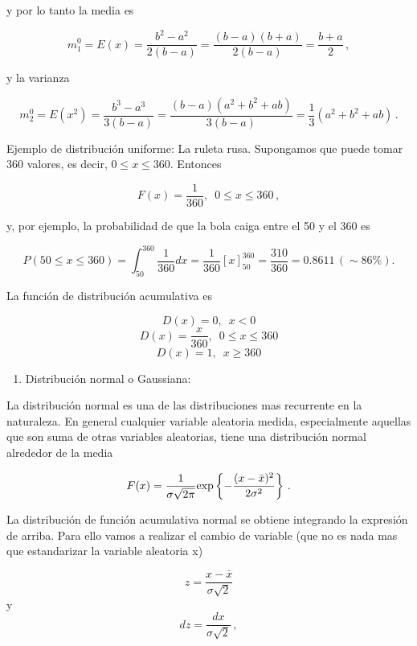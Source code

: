 \documentclass[
]{agujournal2019}
\providecommand{\tightlist}{%
  \setlength{\itemsep}{0pt}\setlength{\parskip}{0pt}}\usepackage{longtable,booktabs,array}
\begin{document}
y por lo tanto la media es

\[m^0_1=E(x)=\frac{b^2-a^2}{2(b-a)}=\frac{(b-a)(b+a)}{2(b-a)}=\frac{b+a}{2}\,,\]

y la varianza

\[m^0_2=E(x^2)=\frac{b^3-a^3}{3(b-a)}=\frac{(b-a)(a^2+b^2+ab)}{3(b-a)}=\frac{1}{3}(a^2 + b^2 +ab)\,.\]

Ejemplo de distribución uniforme: La ruleta rusa. Supongamos que puede
tomar 360 valores, es decir, \(0 \le x \le 360\). Entonces

\[F(x)=\frac{1}{360},\,\,\,0 \le x \le 360\,,\]

y, por ejemplo, la probabilidad de que la bola caiga entre el 50 y el
360 es

\[P(50\le x \le 360)=\int^{360}_{50}\frac{1}{360}dx=\frac{1}{360}\left[x\right]^{360}_{50}=\frac{310}{360}=0.8611\,(\sim86\%).\]

La función de distribución acumulativa es

\[D(x)=0,\,\,\,x<0\] \[D(x)=\frac{x}{360},\,\,\,0 \le x \le 360\]
\[D(x)=1,\,\,\,x \ge 360\]

\vspace{0.5cm}

\begin{enumerate}
\def\labelenumi{\arabic{enumi}.}
\setcounter{enumi}{1}
\tightlist
\item
  Distribución normal o Gaussiana:\\
\end{enumerate}

La distribución normal es una de las distribuciones mas recurrente en la
naturaleza. En general cualquier variable aleatoria medida,
especialmente aquellas que son suma de otras variables aleatorias, tiene
una distribución normal alrededor de la media

\[F(x)=\frac{1}{\sigma\sqrt{2\pi}}{\rm exp}
   \left\{ -\frac{(x-\bar{x})^2}{2\sigma^2} \right\}\,.\]

\begin{center}
\end{center}

La distribución de función acumulativa normal se obtiene integrando la
expresión de arriba. Para ello vamos a realizar el cambio de variable
(que no es nada mas que estandarizar la variable aleatoria x)

\[z=\frac{x-\bar{x}}{\sigma\sqrt{2}}\] y
\[dz=\frac{dx}{\sigma\sqrt{2}}\,,\]
\end{document}
